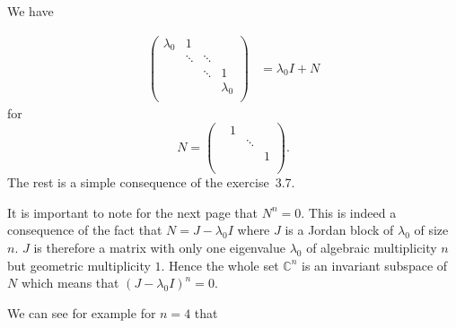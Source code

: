 \begin{solution}
  We have

  \begin{align*}
    \begin{pmatrix}
      \lambda_0 & 1      &        & \\
                & \ddots & \ddots & \\
                &        & \ddots & 1\\
                &        &        & \lambda_0\\
    \end{pmatrix}
    & =
    \lambda_0 I + N
  \end{align*}
  for
  \[
    N =
    \begin{pmatrix}
      & 1 &        & \\
      &   & \ddots & \\
      &   &        & 1\\
      &   &        & \\
    \end{pmatrix}.
  \]
  The rest is a simple consequence of the exercise~3.7.

  It is important to note for the next page that $N^n = 0$.
  This is indeed a consequence of the fact that $N = J - \lambda_0I$
  where $J$ is a Jordan block of $\lambda_0$ of size $n$.
  $J$ is therefore a matrix with only one eigenvalue $\lambda_0$
  of algebraic multiplicity $n$ but geometric multiplicity $1$.
  Hence the whole set $\mathbb{C}^n$ is an invariant subspace of $N$
  which means that $(J - \lambda_0I)^n = 0$.

  We can see for example for $n = 4$ that


\end{solution}
